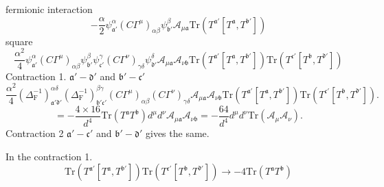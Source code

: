fermionic interaction
\begin{equation*}
	- \frac{\alpha}{2} \psi^\alpha_{\mathfrak{a}'}
	(C\Gamma^\mu)_{\alpha\beta} \psi^\beta_{\mathfrak{b}'}
	\mathcal{A}_{\mu \mathfrak{a}}
	\mathrm{Tr}( T^{\mathfrak{a}'} [ T^{\mathfrak{a}},
	T^{\mathfrak{b}'}])
\end{equation*}
square
\begin{equation*}
	 \frac{\alpha^2}{4} \psi^\alpha_{\mathfrak{a}'}
	(C\Gamma^\mu)_{\alpha\beta} \psi^\beta_{\mathfrak{b}'}
	\psi^\gamma_{\mathfrak{c}'}
		(C\Gamma^\nu)_{\gamma\delta} \psi^\delta_{\mathfrak{d}'}
	\mathcal{A}_{\mu \mathfrak{a}}
	\mathcal{A}_{\nu \mathfrak{b}}
	\mathrm{Tr}( T^{\mathfrak{a}'} [ T^{\mathfrak{a}},
	T^{\mathfrak{b}'}])
	\mathrm{Tr}( T^{\mathfrak{c}'} [ T^{\mathfrak{b}},
	T^{\mathfrak{d}'}])
\end{equation*}
Contraction 1. $\mathfrak{a}'-\mathfrak{d}'$ and $\mathfrak{b}'-\mathfrak{c}'$
\[
\frac{\alpha^2}{4} (\Delta_{\mathrm{F}}^{-1})^{\alpha\delta}_{\mathfrak{a}'\mathfrak{d}'}
		(\Delta_{\mathrm{F}}^{-1})^{\beta\gamma}_{\mathfrak{b}'\mathfrak{c}'}
		(C\Gamma^\mu)_{\alpha\beta} (C\Gamma^\nu)_{\gamma\delta}
	\mathcal{A}_{\mu \mathfrak{a}}
	\mathcal{A}_{\nu \mathfrak{b}}
	\mathrm{Tr}( T^{\mathfrak{a}'} [ T^{\mathfrak{a}},
	T^{\mathfrak{b}'}])
	\mathrm{Tr}( T^{\mathfrak{c}'} [ T^{\mathfrak{b}},
	T^{\mathfrak{d}'}])
.\] 
\[
	= -\frac{4 \times 16}{d^4} \mathrm{Tr}(T^{\mathfrak{a}} T^{\mathfrak{b}})
	 d^\mu d^\nu \mathcal{A}_{\mu \mathfrak{a}}
	\mathcal{A}_{\nu \mathfrak{b}}
	= - \frac{64}{d^4} d^\mu d^\nu \mathrm{Tr}(\mathcal{A}_\mu
	\mathcal{A}_\nu)
.\]
Contraction 2 $\mathfrak{a}'-\mathfrak{c}'$ and $\mathfrak{b}'-\mathfrak{d}'$
gives the same.
\begin{info}
	In the contraction 1.
	\begin{equation*}
	\mathrm{Tr}( T^{\mathfrak{a}'} [ T^{\mathfrak{a}},
	T^{\mathfrak{b}'}])
	\mathrm{Tr}( T^{\mathfrak{c}'} [ T^{\mathfrak{b}},
	T^{\mathfrak{d}'}])
	\to - 4 \mathrm{Tr}(T^{\mathfrak{a}} T^{\mathfrak{b}})
	\end{equation*}
\end{info}
